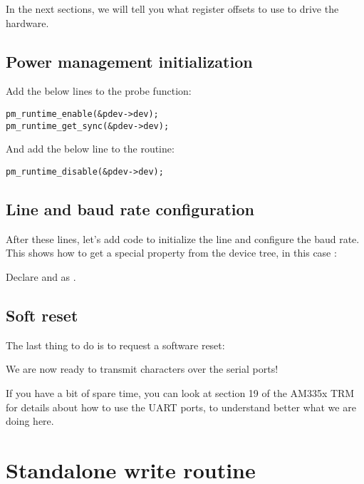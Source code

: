 In the next sections, we will tell you what register offsets to use
to drive the hardware. 

\subsection{Power management initialization}

Add the below lines to the probe function:

\begin{verbatim}
pm_runtime_enable(&pdev->dev);
pm_runtime_get_sync(&pdev->dev);
\end{verbatim}

And add the below line to the  routine:

\begin{verbatim}
pm_runtime_disable(&pdev->dev);
\end{verbatim}

\subsection{Line and baud rate configuration}

After these lines, let's add code to initialize the line
and configure the baud rate. This shows how to get a special
property from the device tree, in this case :


Declare  and  as .

\subsection{Soft reset}

The last thing to do is to request a software reset:


We are now ready to transmit characters over the serial ports!

If you have a bit of spare time, you can look at section 19 of the
AM335x TRM for details about how to use the UART ports, to understand
better what we are doing here.

\section{Standalone write routine}

